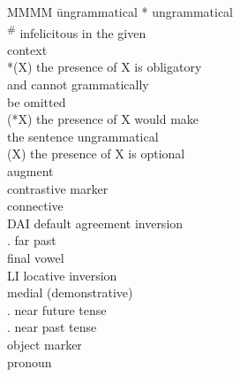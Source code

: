 \documentclass[output=paper]{langscibook}
\begin{document}
\begin{multicols}{2}
\begin{tabbing}
MMMM \= ungrammatical\kill
* \> ungrammatical\\
\textsuperscript{\#} \> infelicitous in the given \\ \> context\\
*(X) \> the presence of X is obligatory \\ \> and cannot grammatically \\ \> be omitted\\
(*X) \> the presence of X would make \\ \> the sentence ungrammatical\\
(X) \> the presence of X is optional\\
\AUG{} \> augment\\
\CM{} \> contrastive marker\\
\CONN{} \> connective\\
DAI \> default agreement inversion\\
\F{}.\PST{} \> far past\\
\FV{} \> final vowel\\
LI \> locative inversion\\
\MED{} \> medial (demonstrative) \\
\N{}.\FUT{} \> near future tense \\
\N{}.\PST{} \> near past tense\\
\OM{} \> object marker \\
\PRO{} \> pronoun \\

\end{tabbing}
\end{multicols}
\end{document}
